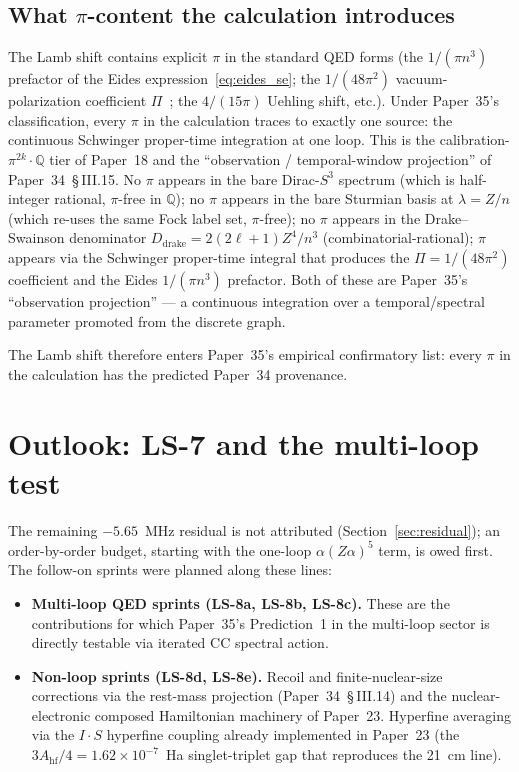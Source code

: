 \documentclass[11pt]{article}
\begin{document}
\subsection{What $\pi$-content the calculation introduces}

The Lamb shift contains explicit $\pi$ in the standard QED forms (the
$1/(\pi n^3)$ prefactor of the Eides expression~\eqref{eq:eides_se};
the $1/(48\pi^2)$ vacuum-polarization coefficient
$\Pi$~\cite{paper28}; the $4/(15\pi)$ Uehling shift, etc.).  Under
Paper~35's classification, every $\pi$ in the calculation traces to
exactly one source: the continuous Schwinger proper-time integration
at one loop.  This is the calibration-$\pi^{2k}\cdot\mathbb{Q}$ tier
of Paper~18 and the ``observation / temporal-window projection''
of Paper~34~\S\,III.15.  No $\pi$ appears in the bare Dirac-$S^3$
spectrum (which is half-integer rational, $\pi$-free in $\mathbb{Q}$);
no $\pi$ appears in the bare Sturmian basis at $\lambda = Z/n$ (which
re-uses the same Fock label set, $\pi$-free); no $\pi$ appears in the
Drake--Swainson denominator $D_\text{drake} = 2(2\ell + 1) Z^4 / n^3$
(combinatorial-rational); $\pi$ appears via the Schwinger proper-time
integral that produces the $\Pi = 1/(48\pi^2)$ coefficient and the
Eides $1/(\pi n^3)$ prefactor.  Both of these are Paper~35's
``observation projection'' --- a continuous integration over a
temporal/spectral parameter promoted from the discrete graph.

The Lamb shift therefore enters Paper~35's empirical confirmatory
list: every $\pi$ in the calculation has the predicted Paper~34
provenance.

\section{Outlook: LS-7 and the multi-loop test}
\label{sec:outlook}

The remaining $-5.65$~MHz residual is not attributed
(Section~\ref{sec:residual}); an order-by-order budget, starting with
the one-loop $\alpha(Z\alpha)^5$ term, is owed first.  The follow-on
sprints were planned along these lines:

\begin{itemize}
\setlength\itemsep{0pt}
\item \textbf{Multi-loop QED sprints (LS-8a, LS-8b, LS-8c).}  These are
the contributions for which
Paper~35's Prediction~1 in the multi-loop sector is directly testable
via iterated CC spectral action.
\item \textbf{Non-loop sprints (LS-8d, LS-8e).}  Recoil and
finite-nuclear-size corrections via the rest-mass projection
(Paper~34~\S\,III.14) and the nuclear-electronic composed Hamiltonian
machinery of Paper~23.  Hyperfine averaging via the $I \cdot S$
hyperfine coupling already implemented in Paper~23 (the $3 A_\text{hf}/4
= 1.62 \times 10^{-7}$~Ha singlet-triplet gap that reproduces the
21~cm line).
\end{itemize}
\end{document}
